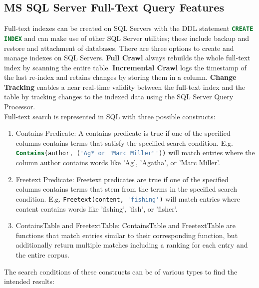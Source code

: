 \subsection{MS SQL Server Full-Text Query Features}
Full-text indexes can be created on \ac{SQL} Servers with the \ac{DDL} statement \lstinline[language=SQL]$CREATE INDEX$ and can make use of other \ac{SQL} Server utilities; these include backup and restore and attachment of databases. There are three options to create and manage indexes on \ac{SQL} Servers. \textbf{Full Crawl} always rebuilds the whole full-text index by scanning the entire table. \textbf{Incremental Crawl} logs the timestamp of the last re-index and retains changes by storing them in a column. \textbf{Change Tracking} enables a near real-time validity between the full-text index and the table by tracking changes to the indexed data using the \ac{SQL} Server Query Processor. \parencite[cf.][p. 9]{hamilton_microsoft_2001}\\
Full-text search is represented in \ac{SQL} with three possible constructs: \parencite[cf.][p. 9]{hamilton_microsoft_2001}
\begin{enumerate}
    \item Contains Predicate: A contains predicate is true if one of the specified columns contains terms that satisfy the specified search condition. E.g. \lstinline[language=SQL]$Contains(author, ('Ag* or "Marc Miller"'))$ will match entries where the column author contains words like 'Ag', 'Agatha', or 'Marc Miller'.
    \item Freetext Predicate: Freetext predicates are true if one of the specified columns contains terms that stem from the terms in the specified search condition. E.g. \lstinline[language=SQL]$Freetext(content, 'fishing')$ will match entries where content contains words like 'fishing', 'fish', or 'fisher'.
    \item ContainsTable and FreetextTable: ContainsTable and FreetextTable are functions that match entries similar to their corresponding function, but additionally return multiple matches including a ranking for each entry and the entire corpus.
\end{enumerate}
The search conditions of these constructs can be of various types to find the intended results: \parencite[cf.][p. 9]{hamilton_microsoft_2001}
